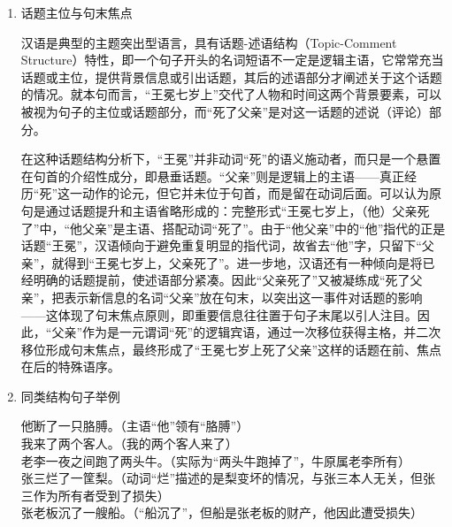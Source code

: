 \documentclass[10pt]{ctexart}
\begin{document}
\begin{enumerate}
    从句法形式上看，这种表达违背了表层逻辑：动词``死''与它前后的名词在语义关系上与句法地位不对应，容易给习惯典型语序的人造成困惑。有学者认为在``死了父亲''句中，动词``死''的语义主语是``父亲’''，却处于宾语位置，从形式上看好像主语和谓语的关系是悬空的。但这种``不合逻辑''只是表面现象，母语者读到``王冕七岁上死了父亲''时，自然而然会理解为``王冕在七岁时失去了父亲''，即父亲去世了。几乎不会有人误解为``王冕把父亲给死了''这样的荒诞意思，因为``死''不可能他致他父亲于死地（那要用``杀了父亲''）。因此实际语义逻辑通过语境可以顺利还原：领属关系暗示了父亲之死与王冕相关。

    \item 话题主位与句末焦点

    汉语是典型的主题突出型语言，具有话题-述语结构（Topic-Comment Structure）特性，即一个句子开头的名词短语不一定是逻辑主语，它常常充当话题或主位，提供背景信息或引出话题，其后的述语部分才阐述关于这个话题的情况。就本句而言，``王冕七岁上''交代了人物和时间这两个背景要素，可以被视为句子的主位或话题部分，而``死了父亲''是对这一话题的述说（评论）部分。

    在这种话题结构分析下，``王冕''并非动词``死''的语义施动者，而只是一个悬置在句首的介绍性成分，即悬垂话题。``父亲''则是逻辑上的主语——真正经历``死''这一动作的论元，但它并未位于句首，而是留在动词后面。可以认为原句是通过话题提升和主语省略形成的：完整形式``王冕七岁上，（他）父亲死了''中，``他父亲''是主语、搭配动词``死了''。由于``他父亲''中的``他''指代的正是话题``王冕''，汉语倾向于避免重复明显的指代词，故省去``他''字，只留下``父亲''，就得到``王冕七岁上，父亲死了''。进一步地，汉语还有一种倾向是将已经明确的话题提前，使述语部分紧凑。因此``父亲死了''又被凝练成``死了父亲''，把表示新信息的名词``父亲''放在句末，以突出这一事件对话题的影响——这体现了句末焦点原则，即重要信息往往置于句子末尾以引人注目。因此，``父亲''作为是一元谓词``死''的逻辑宾语，通过一次移位获得主格，并二次移位形成句末焦点，最终形成了``王冕七岁上死了父亲''这样的话题在前、焦点在后的特殊语序。

    \item 同类结构句子举例

    {\kaishu
    \begin{tabbing}
        \hspace{1cm}
        \=他断了一只胳膊。（主语``他''领有``胳膊''）\\[0.5em]
        \>我来了两个客人。（我的两个客人来了）\\[0.5em]
        \>老李一夜之间跑了两头牛。（实际为``两头牛跑掉了''，牛原属老李所有）\\[0.5em]
        \>张三烂了一筐梨。（动词``烂''描述的是梨变坏的情况，与张三本人无关，但张三作为所有者受到了损失）\\[0.5em]
        \>张老板沉了一艘船。（``船沉了''，但船是张老板的财产，他因此遭受损失）
    \end{tabbing}
    }


\end{enumerate}
\end{document}
